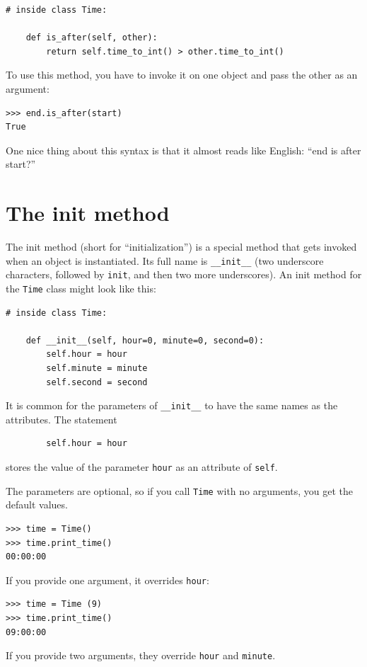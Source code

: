 \documentclass[10pt]{book}
\begin{document}
\begin{CJK}{UTF8}{gbsn}
\begin{verbatim}
# inside class Time:

    def is_after(self, other):
        return self.time_to_int() > other.time_to_int()
\end{verbatim}
%
To use this method, you have to invoke it on one object and pass
the other as an argument:

\begin{verbatim}
>>> end.is_after(start)
True
\end{verbatim}
%
One nice thing about this syntax is that it almost reads
like English: ``end is after start?''


\section{The init method}

The init method (short for ``initialization'') is
a special method that gets invoked when an object is instantiated.  
Its full name is \verb"__init__" (two underscore characters,
followed by {\tt init}, and then two more underscores).  An
init method for the {\tt Time} class might look like this:

\begin{verbatim}
# inside class Time:

    def __init__(self, hour=0, minute=0, second=0):
        self.hour = hour
        self.minute = minute
        self.second = second
\end{verbatim}
%
It is common for the parameters of \verb"__init__"
to have the same names as the attributes.  The statement

\begin{verbatim}
        self.hour = hour
\end{verbatim}
%
stores the value of the parameter {\tt hour} as an attribute
of {\tt self}.

The parameters are optional, so if you call {\tt Time} with
no arguments, you get the default values.

\begin{verbatim}
>>> time = Time()
>>> time.print_time()
00:00:00
\end{verbatim}
%
If you provide one argument, it overrides {\tt hour}:

\begin{verbatim}
>>> time = Time (9)
>>> time.print_time()
09:00:00
\end{verbatim}
%
If you provide two arguments, they override {\tt hour} and
{\tt minute}.


\end{CJK}
\end{document}
